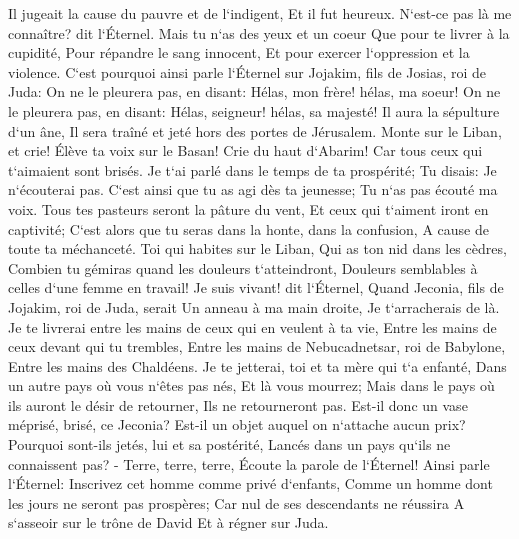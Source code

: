 \verse Il jugeait la cause du pauvre et de l`indigent, Et il fut heureux. N`est-ce pas là me connaître? dit l`Éternel. 
\verse Mais tu n`as des yeux et un coeur Que pour te livrer à la cupidité, Pour répandre le sang innocent, Et pour exercer l`oppression et la violence. 
\verse C`est pourquoi ainsi parle l`Éternel sur Jojakim, fils de Josias, roi de Juda: On ne le pleurera pas, en disant: Hélas, mon frère! hélas, ma soeur! On ne le pleurera pas, en disant: Hélas, seigneur! hélas, sa majesté! 
\verse Il aura la sépulture d`un âne, Il sera traîné et jeté hors des portes de Jérusalem. 
\verse Monte sur le Liban, et crie! Élève ta voix sur le Basan! Crie du haut d`Abarim! Car tous ceux qui t`aimaient sont brisés. 
\verse Je t`ai parlé dans le temps de ta prospérité; Tu disais: Je n`écouterai pas. C`est ainsi que tu as agi dès ta jeunesse; Tu n`as pas écouté ma voix. 
\verse Tous tes pasteurs seront la pâture du vent, Et ceux qui t`aiment iront en captivité; C`est alors que tu seras dans la honte, dans la confusion, A cause de toute ta méchanceté. 
\verse Toi qui habites sur le Liban, Qui as ton nid dans les cèdres, Combien tu gémiras quand les douleurs t`atteindront, Douleurs semblables à celles d`une femme en travail! 
\verse Je suis vivant! dit l`Éternel, Quand Jeconia, fils de Jojakim, roi de Juda, serait Un anneau à ma main droite, Je t`arracherais de là. 
\verse Je te livrerai entre les mains de ceux qui en veulent à ta vie, Entre les mains de ceux devant qui tu trembles, Entre les mains de Nebucadnetsar, roi de Babylone, Entre les mains des Chaldéens. 
\verse Je te jetterai, toi et ta mère qui t`a enfanté, Dans un autre pays où vous n`êtes pas nés, Et là vous mourrez; 
\verse Mais dans le pays où ils auront le désir de retourner, Ils ne retourneront pas. 
\verse Est-il donc un vase méprisé, brisé, ce Jeconia? Est-il un objet auquel on n`attache aucun prix? Pourquoi sont-ils jetés, lui et sa postérité, Lancés dans un pays qu`ils ne connaissent pas? - 
\verse Terre, terre, terre, Écoute la parole de l`Éternel! 
\verse Ainsi parle l`Éternel: Inscrivez cet homme comme privé d`enfants, Comme un homme dont les jours ne seront pas prospères; Car nul de ses descendants ne réussira A s`asseoir sur le trône de David Et à régner sur Juda. 

